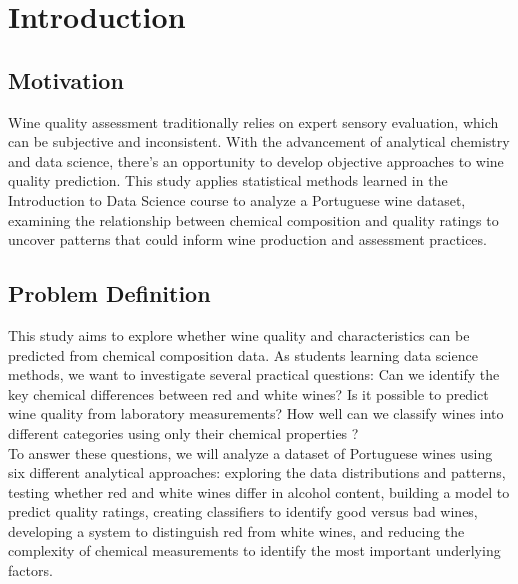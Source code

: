 \chapter{Introduction}

\section{Motivation}

Wine quality assessment traditionally relies on expert sensory evaluation, which can be subjective and inconsistent. With the advancement of analytical chemistry and data science, there's an opportunity to develop objective approaches to wine quality prediction. This study applies statistical methods learned in the Introduction to Data Science course to analyze a Portuguese wine dataset, examining the relationship between chemical composition and quality ratings to uncover patterns that could inform wine production and assessment practices.\\

\section{Problem Definition}

This study aims to explore whether wine quality and characteristics can be predicted from chemical composition data. As students learning data science methods, we want to investigate several practical questions: Can we identify the key chemical differences between red and white wines? Is it possible to predict wine quality from laboratory measurements? How well can we classify wines into different categories using only their chemical properties ?\\

To answer these questions, we will analyze a dataset of Portuguese wines using six different analytical approaches: exploring the data distributions and patterns, testing whether red and white wines differ in alcohol content, building a model to predict quality ratings, creating classifiers to identify good versus bad wines, developing a system to distinguish red from white wines, and reducing the complexity of chemical measurements to identify the most important underlying factors.\\